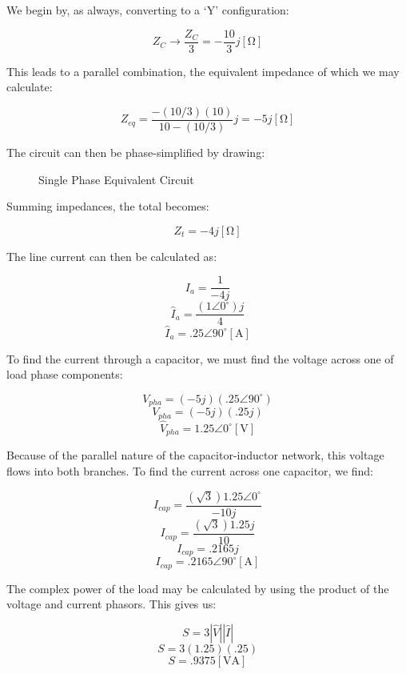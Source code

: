 \begin{enumerate}
    We begin by, as always, converting to a `Y' configuration:

    $$Z_C\to \frac{Z_C}{3}=-\frac{10}{3}j[\si{\ohm}]$$

    This leads to a parallel combination, the equivalent impedance of which we may calculate:

    $$Z_{eq}=\frac{-(10/3)(10)}{10-(10/3)}j=-5j[\si{\ohm}]$$

    The circuit can then be phase-simplified by drawing:

    \begin{figure}[H]
      \centering
      
      \caption{Single Phase Equivalent Circuit}
      \label{fig:2}
    \end{figure}

    Summing impedances, the total becomes:

    $$Z_t=-4j[\si{\ohm}]$$

    The line current can then be calculated as:

    $$I_a=\frac{1}{-4j}$$
    $$\hat{I}_a=\frac{(1\angle0^{\circ})j}{4}$$
    $$\boxed{\hat{I}_a=.25\angle90^{\circ}[\si{\ampere}]}$$

    To find the current through a capacitor, we must find the voltage across one of load phase components:

    $$V_{pha}=(-5j)(.25\angle90^{\circ})$$
    $$V_{pha}=(-5j)(.25j)$$
    $$\hat{V}_{pha}=1.25\angle0^{\circ}[\si{\volt}]$$

    Because of the parallel nature of the capacitor-inductor network, this voltage flows into both branches. To find the current across one capacitor, we find:

    $$I_{cap}=\frac{(\sqrt{3})1.25\angle0^{\circ}}{-10j}$$
    $$I_{cap}=\frac{(\sqrt{3})1.25j}{10}$$
    $$I_{cap}=.2165j$$
    $$\boxed{I_{cap}=.2165\angle90^{\circ}[\si{\ampere}]}$$

    The complex power of the load may be calculated by using the product of the voltage and current phasors. This gives us:

    $$S=3|\hat{V}||\hat{I}|$$
    $$S=3\left(1.25\right)\left(  .25\right)$$
    $$\boxed{S=.9375[\si{\volt\ampere}]}$$

\end{enumerate}



